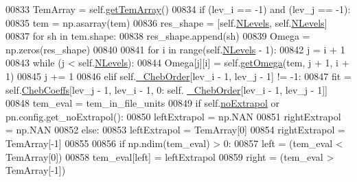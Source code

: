 \begin{DoxyCode}
00833         TemArray = self.\hyperlink{classpyneb_1_1core_1_1pynebcore_1_1___coll_data_fits_a6b53fa73abb34d16f1066dc52604f25c}{getTemArray}()
00834         \textcolor{keywordflow}{if} (lev\_i == -1) \textcolor{keywordflow}{and} (lev\_j == -1):
00835             tem = np.asarray(tem)
00836             res\_shape = [self.\hyperlink{classpyneb_1_1core_1_1pynebcore_1_1___coll_data_fits_a64b97a86b4dfb53e4cba3ce8ac0fdf00}{NLevels}, self.\hyperlink{classpyneb_1_1core_1_1pynebcore_1_1___coll_data_fits_a64b97a86b4dfb53e4cba3ce8ac0fdf00}{NLevels}]
00837             \textcolor{keywordflow}{for} sh \textcolor{keywordflow}{in} tem.shape:
00838                 res\_shape.append(sh)
00839             Omega = np.zeros(res\_shape)
00840     
00841             \textcolor{keywordflow}{for} i \textcolor{keywordflow}{in} range(self.\hyperlink{classpyneb_1_1core_1_1pynebcore_1_1___coll_data_fits_a64b97a86b4dfb53e4cba3ce8ac0fdf00}{NLevels} - 1):
00842                 j = i + 1
00843                 \textcolor{keywordflow}{while} (j < self.\hyperlink{classpyneb_1_1core_1_1pynebcore_1_1___coll_data_fits_a64b97a86b4dfb53e4cba3ce8ac0fdf00}{NLevels}):
00844                     Omega[j][i] = self.\hyperlink{classpyneb_1_1core_1_1pynebcore_1_1___coll_data_fits_a07beca7cf9ee37f231754f0458fb8c2f}{getOmega}(tem, j + 1, i + 1)
00845                     j += 1
00846         \textcolor{keywordflow}{elif} self.\hyperlink{classpyneb_1_1core_1_1pynebcore_1_1___coll_data_fits_aeb6a6f312ca21c1e1b3aa72225a0d442}{\_ChebOrder}[lev\_i - 1, lev\_j - 1] != -1:
00847             fit = self.\hyperlink{classpyneb_1_1core_1_1pynebcore_1_1___coll_data_fits_af8eaa90b2ddbf77c0a78b648e9f66971}{ChebCoeffs}[lev\_j - 1, lev\_i - 1, 0: self.
      \hyperlink{classpyneb_1_1core_1_1pynebcore_1_1___coll_data_fits_aeb6a6f312ca21c1e1b3aa72225a0d442}{\_ChebOrder}[lev\_i - 1, lev\_j - 1]]
00848             tem\_eval = tem\_in\_file\_units
00849             \textcolor{keywordflow}{if} self.\hyperlink{classpyneb_1_1core_1_1pynebcore_1_1___coll_data_fits_a97b30abb66948d40dc2077a3c3b15231}{noExtrapol} \textcolor{keywordflow}{or} pn.config.get\_noExtrapol():
00850                 leftExtrapol = np.NAN
00851                 rightExtrapol = np.NAN
00852             \textcolor{keywordflow}{else}:
00853                 leftExtrapol = TemArray[0]
00854                 rightExtrapol = TemArray[-1]
00855             
00856             \textcolor{keywordflow}{if} np.ndim(tem\_eval) > 0:
00857                 left = (tem\_eval < TemArray[0])
00858                 tem\_eval[left] = leftExtrapol
00859                 right = (tem\_eval > TemArray[-1])

\end{DoxyCode}
